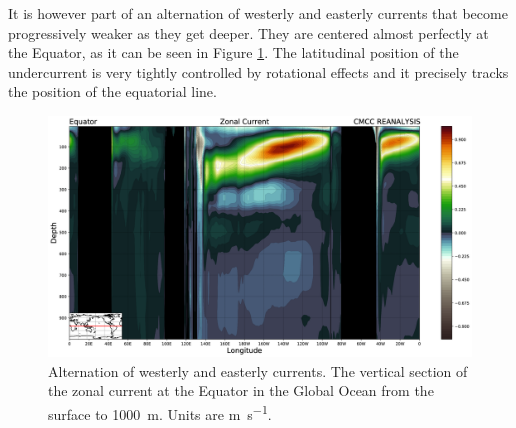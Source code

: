 It is however part of an alternation of westerly and easterly currents
that become progressively weaker as they get deeper. They are centered
almost perfectly at the Equator, as it can be seen in Figure \ref{fig:vertical-section-zonal-current-equator}.
The latitudinal position of the undercurrent is very tightly controlled by rotational effects and it precisely tracks the position of the equatorial line.

\begin{figure}
	\centering
	\includegraphics[width = 0.4 \textwidth]{figs/vertical-section-zonal-current-equator}
	\caption{Alternation of westerly and easterly currents. The vertical section of the zonal current at the Equator in the Global Ocean from the surface to \qty{1000}{\meter}. Units are \unit{\meter \per \second}.}
	\label{fig:vertical-section-zonal-current-equator}
\end{figure}

